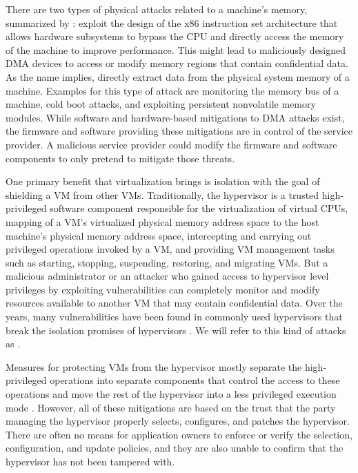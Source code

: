 \begin{description}
    There are two types of physical attacks related to a machine's memory,
    summarized by \citeauthor{weis2014protecting} \cite{weis2014protecting}:
     exploit the design of the x86
    instruction set architecture that allows hardware subsystems to bypass the
    CPU and directly access the memory of the machine to improve performance.
    This might lead to maliciously designed DMA devices to access or modify
    memory regions that contain confidential data. As the name implies,
     directly extract data from
    the physical system memory of a machine. Examples for this type of attack
    are monitoring the memory bus of a machine, cold boot attacks, and
    exploiting persistent nonvolatile memory modules. While software and
    hardware-based mitigations to DMA attacks exist, the firmware and software
    providing these mitigations are in control of the service provider. A
    malicious service provider could modify the firmware and software components
    to only pretend to mitigate those threats.

    One primary benefit that virtualization brings is isolation with the goal of
    shielding a VM from other VMs. Traditionally, the hypervisor is a trusted
    high-privileged software component responsible for the virtualization of
    virtual CPUs, mapping of a VM's virtualized physical memory address space to
    the host machine's physical memory address space, intercepting and carrying
    out privileged operations invoked by a VM, and providing VM management tasks
    such as starting, stopping, suspending, restoring, and migrating VMs. But a
    malicious administrator or an attacker who gained access to hypervisor level
    privileges by exploiting vulnerabilities can completely monitor and modify
    resources available to another VM that may contain confidential data. Over
    the years, many vulnerabilities have been found in commonly used hypervisors
    that break the isolation promises of hypervisors
    \cite{perezbotero2013hypervisorvulnerabilities,
      reuben2007surveyvirtualmachinesecurity}. We will refer to this kind of
    attacks as .

    Measures for protecting VMs from the hypervisor mostly separate the
    high-privileged operations into separate components that control the access
    to these operations and move the rest of the hypervisor into a less
    privileged execution mode \cite{jin2011securevirtualization,
      szefer2012hypvervisorsecurevirtualization, li2019protectingvmfromhypervisor,
      mi2020disaggregatednestedvirtualization}. However, all of these mitigations
    are based on the trust that the party managing the hypervisor properly
    selects, configures, and patches the hypervisor. There are often no means
    for application owners to enforce or verify the selection, configuration,
    and update policies, and they are also unable to confirm that the hypervisor
    has not been tampered with.


\end{description}

